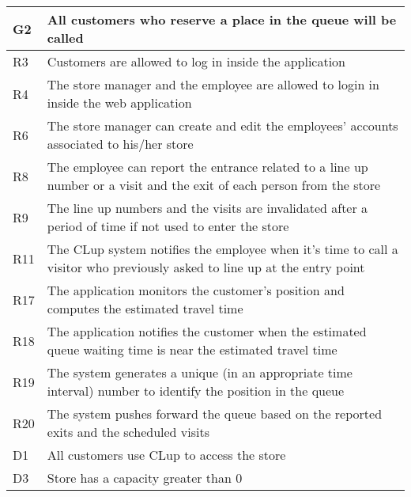\begin{center}
        {\renewcommand{\arraystretch}{1.5}
        \begin{longtable}{L{2cm}L{12cm}}
            \hline
            \textbf{G2} & \textbf{All customers who reserve a place in the queue will be called} \\
            \hline
             R3 & Customers are allowed to log in inside the application \\
            \hline
             R4 & The store manager and the employee are allowed to login in inside the web application \\
            \hline
             R6 & The store manager can create and edit the employees’ accounts associated to his/her store \\
            \hline
             R8 & The employee can report the entrance related to a line up number or a visit and the exit of each person from the store \\
            \hline
             R9 & The line up numbers and the visits are invalidated after a period of time if not used to enter the store \\
            \hline
             R11 & The CLup system notifies the employee when it’s time to call a visitor who previously asked to line up at the entry point \\
            \hline
             R17 & The application monitors the customer’s position and computes the estimated travel time \\
            \hline
             R18 & The application notifies the customer when the estimated queue waiting time is near the estimated travel time \\
            \hline
             R19 & The system generates a unique (in an appropriate time interval) number to identify the position in the queue \\
            \hline
             R20 & The system pushes forward the queue based on the reported exits and the scheduled visits \\
            \hline
             D1 & All customers use CLup to access the store \\
            \hline
             D3 & Store has a capacity greater than 0 \\

\end{longtable}}
\end{center}
